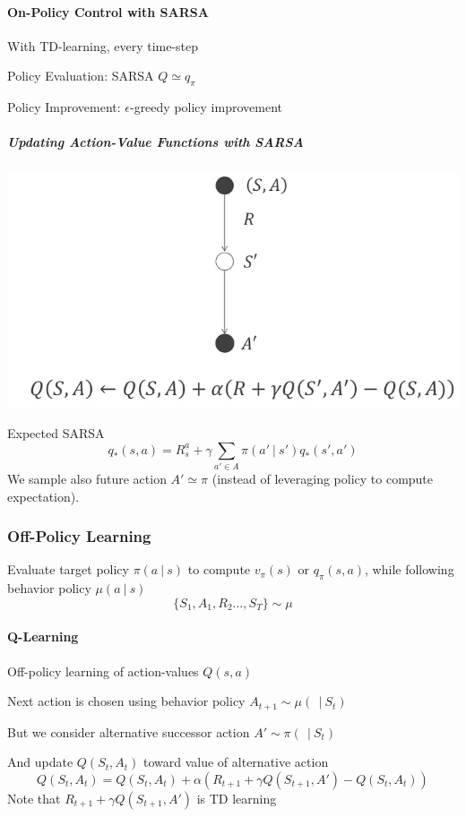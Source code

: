 \documentclass[10pt]{report}
\begin{document}
\paragraph{On-Policy Control with SARSA} With TD-learning, every time-step
\begin{list}{}{}
	\item Policy Evaluation: SARSA $Q\simeq q_\pi$
	\item Policy Improvement: $\epsilon$-greedy policy improvement
\end{list}
\subparagraph{Updating Action-Value Functions with SARSA}
\begin{center}
	\includegraphics[scale=0.5]{173.png}
\end{center}
Expected SARSA
$$q_*(s,a) = R_s^a+\gamma\sum_{a'\in A}\pi(a'\:|\:s')q_*(s',a')$$
We sample also future action $A'\simeq \pi$ (instead of leveraging policy to compute expectation).
\subsubsection{Off-Policy Learning} Evaluate target policy $\pi(a\:|\:s)$ to compute $v_\pi(s)$ or $q_\pi(s,a)$, while following behavior policy $\mu(a\:|\:s)$
$$\{S_1,A_1,R_2\ldots,S_T\}\sim\mu$$
\paragraph{Q-Learning} Off-policy learning of action-values $Q(s,a)$
\begin{list}{}{}
	\item Next action is chosen using behavior policy $A_{t+1}\sim \mu(\:\:|\:S_t)$
	\item But we consider alternative successor action $A'\sim\pi(\:\:|\:S_t)$
	\item And update $Q(S_t,A_t)$ toward value of alternative action
	$$Q(S_t,A_t) = Q(S_t,A_t) + \alpha(R_{t+1} + \gamma Q(S_{t+1},A') - Q(S_t,A_t))$$
	Note that $R_{t+1} + \gamma Q(S_{t+1},A')$ is TD learning
\end{list}
\end{document}
